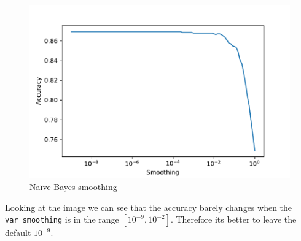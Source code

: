 \begin{figure}[H]
    \centering
    \includegraphics{figures/naive_bayes_smoothing_cv.pdf}
    \caption{Na\"ive Bayes smoothing}%
    \label{fig:naive_bayes_smoothing_cv}
\end{figure}

Looking at the image we can see that the accuracy barely changes when the \texttt{var\_smoothing} is in the range $[10^{-9}, 10^{-2}]$. Therefore its better to leave the default $10^{-9}$.

